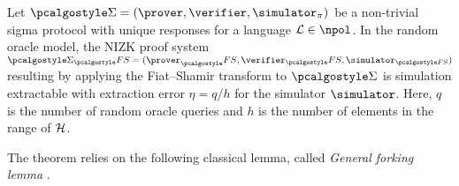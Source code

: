 \let\accentvec\vec \documentclass[runningheads,10pt]{llncs}
\begin{document}
\begin{theorem}
	Let $\sigmaprot = (\prover, \verifier, \simulator_\zkproof)$ be a non-trivial sigma protocol with unique responses for a language $\LANG \in \npol$.
	In the random oracle model, the NIZK proof system $\sigmaprot_\fs = (\prover_\fs, \verifier_\fs, \simulator_{\fs})$ resulting by applying the Fiat--Shamir transform to $\sigmaprot$ is simulation extractable with extraction error $\eta = q/h$ for the simulator $\simulator$. Here, $q$ is the number of random oracle queries and $h$ is the number of elements in the range of $\mathcal{H}$.
\end{theorem}

The theorem relies on the following classical lemma, called \emph{General forking lemma} \cite{JC:PoiSte00}.
\end{document}

